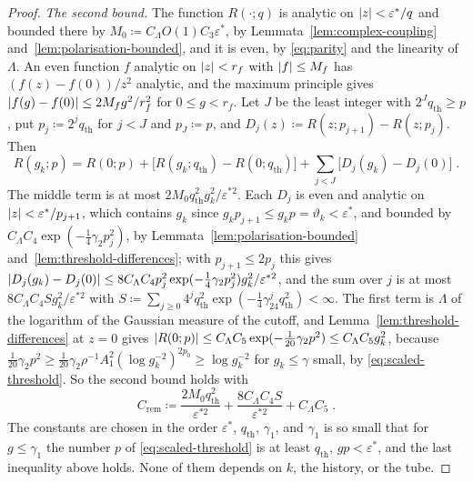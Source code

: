 \documentclass[11pt]{preprint}
\DeclarePairedDelimiter{\abs}{\lvert}{\rvert}
\numberwithin{equation}{section}
\theoremstyle{definition}
\theoremstyle{remark}
\theoremstyle{plain}
\begin{document}
\begin{proof}
\emph{The second bound.} The function $R(\cdot; q)$ is analytic on $\abs{z} < \varepsilon^*/q$ and bounded there by $M_0 \coloneqq C_\Lambda O(1)C_3\varepsilon^*$, by Lemmata~\ref{lem:complex-coupling} and~\ref{lem:polarisation-bounded}, and it is even, by \eqref{eq:parity} and the linearity of $\Lambda$. An even function $f$ analytic on $\abs{z} < r_f$ with $\abs{f} \leq M_f$ has $(f(z) - f(0))/z^2$ analytic, and the maximum principle gives $\abs{f(g) - f(0)} \leq 2M_fg^2/r_f^2$ for $0 \leq g < r_f$. Let $J$ be the least integer with $2^Jq_{\mathrm{th}} \geq p$, put $p_j \coloneqq 2^jq_{\mathrm{th}}$ for $j < J$ and $p_J \coloneqq p$, and $D_j(z) \coloneqq R(z; p_{j+1}) - R(z; p_j)$. Then
\begin{equation}\label{eq:telescoping}
    R(g_k; p) = R(0; p) + \bigl[R(g_k; q_{\mathrm{th}}) - R(0; q_{\mathrm{th}})\bigr] + \sum_{j<J}\bigl[D_j(g_k) - D_j(0)\bigr]\;.
\end{equation}
The middle term is at most $2M_0q_{\mathrm{th}}^2g_k^2/\varepsilon^{*2}$. Each $D_j$ is even and analytic on $\abs{z} < \varepsilon^*/p_{j+1}$, which contains $g_k$ since $g_kp_{j+1} \leq g_kp = \vartheta_k < \varepsilon^*$, and bounded by $C_\Lambda C_4\exp(-\frac14\gamma_2p_j^2)$, by Lemmata~\ref{lem:polarisation-bounded} and~\ref{lem:threshold-differences}; with $p_{j+1} \leq 2p_j$ this gives $\abs{D_j(g_k) - D_j(0)} \leq 8C_\Lambda C_4p_j^2\exp(-\frac14\gamma_2p_j^2)g_k^2/\varepsilon^{*2}$, and the sum over $j$ is at most $8C_\Lambda C_4Sg_k^2/\varepsilon^{*2}$ with $S \coloneqq \sum_{j \geq 0}4^jq_{\mathrm{th}}^2\exp(-\frac14\gamma_24^jq_{\mathrm{th}}^2) < \infty$. The first term is $\Lambda$ of the logarithm of the Gaussian measure of the cutoff, and Lemma~\ref{lem:threshold-differences} at $z = 0$ gives $\abs{R(0; p)} \leq C_\Lambda C_5\exp(-\frac{1}{20}\gamma_2p^2) \leq C_\Lambda C_5g_k^2$, because $\frac{1}{20}\gamma_2p^2 \geq \frac{1}{20}\gamma_2\rho^{-1}A_1^2(\log g_k^{-2})^{2p_0} \geq \log g_k^{-2}$ for $g_k \leq \gamma$ small, by \eqref{eq:scaled-threshold}. So the second bound holds with
\begin{equation}\label{eq:c-rem}
    C_{\mathrm{rem}} \coloneqq \frac{2M_0q_{\mathrm{th}}^2}{\varepsilon^{*2}} + \frac{8C_\Lambda C_4S}{\varepsilon^{*2}} + C_\Lambda C_5\;.
\end{equation}
The constants are chosen in the order $\varepsilon^*$, $q_{\mathrm{th}}$, $\gamma_1$, and $\gamma_1$ is so small that for $g \leq \gamma_1$ the number $p$ of \eqref{eq:scaled-threshold} is at least $q_{\mathrm{th}}$, $gp < \varepsilon^*$, and the last inequality above holds. None of them depends on $k$, the history, or the tube.
\end{proof}
\end{document}

